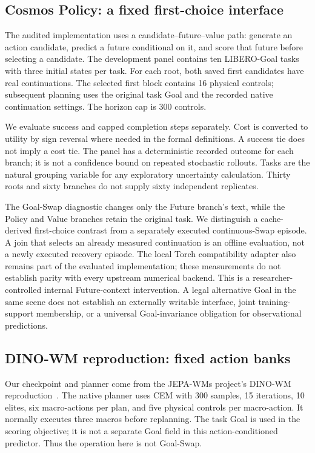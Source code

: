 \documentclass[11pt]{article}
\begin{document}
\subsection{Cosmos Policy: a fixed first-choice interface}
The audited implementation uses a candidate--future--value path: generate an
action candidate, predict a future conditional on it, and score that future
before selecting a candidate. The development panel contains ten LIBERO-Goal
tasks with three initial states per task. For each root, both saved first
candidates have real continuations. The selected first block contains 16
physical controls; subsequent planning uses the original task Goal and the
recorded native continuation settings. The horizon cap is 300 controls.

We evaluate success and capped completion steps separately. Cost is converted
to utility by sign reversal where needed in the formal definitions. A success
tie does not imply a cost tie. The panel has a deterministic recorded outcome
for each branch; it is not a confidence bound on repeated stochastic rollouts.
Tasks are the natural grouping variable for any exploratory uncertainty
calculation. Thirty roots and sixty branches do not supply sixty independent
replicates.

The Goal-Swap diagnostic changes only the Future branch's text, while the
Policy and Value branches retain the original task. We distinguish a
cache-derived first-choice contrast from a separately executed continuous-Swap
episode. A join that selects an already measured continuation is an offline
evaluation, not a newly executed recovery episode. The local Torch compatibility
adapter also remains part of the evaluated implementation; these measurements
do not establish parity with every upstream numerical backend.
This is a researcher-controlled internal Future-context intervention.
A legal alternative Goal in the same scene does not establish an externally
writable interface, joint training-support membership, or a universal
Goal-invariance obligation for observational predictions.

\subsection{DINO-WM reproduction: fixed action banks}
Our checkpoint and planner come from the JEPA-WMs project's DINO-WM
reproduction~\cite{terver2025drivessuccessphysicalplanning}.
The native planner uses CEM with 300 samples, 15 iterations, 10 elites, six
macro-actions per plan, and five physical controls per macro-action. It
normally executes three macros before replanning. The task Goal is used in
the scoring objective; it is not a separate Goal field in this action-conditioned
predictor. Thus the operation here is not Goal-Swap.
\end{document}
